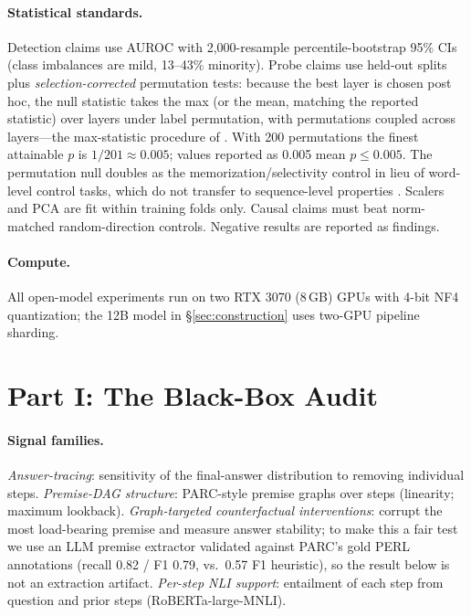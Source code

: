 \documentclass[11pt]{article}
\begin{document}
\paragraph{Statistical standards.} Detection claims use AUROC with 2{,}000-resample percentile-bootstrap 95\% CIs (class imbalances are mild, 13--43\% minority). Probe claims use held-out splits plus \emph{selection-corrected} permutation tests: because the best layer is chosen post hoc, the null statistic takes the max (or the mean, matching the reported statistic) over layers under label permutation, with permutations coupled across layers---the max-statistic procedure of \citet{nichols2002nonparametric}. With 200 permutations the finest attainable $p$ is $1/201 \approx 0.005$; values reported as 0.005 mean $p \leq 0.005$. The permutation null doubles as the memorization/selectivity control in lieu of word-level control tasks, which do not transfer to sequence-level properties \citep{belinkov2022probing}. Scalers and PCA are fit within training folds only. Causal claims must beat norm-matched random-direction controls. Negative results are reported as findings.

\paragraph{Compute.} All open-model experiments run on two RTX 3070 (8\,GB) GPUs with 4-bit NF4 quantization; the 12B model in \S\ref{sec:construction} uses two-GPU pipeline sharding.

\section{Part I: The Black-Box Audit}
\label{sec:audit}

\paragraph{Signal families.} \emph{Answer-tracing}: sensitivity of the final-answer distribution to removing individual steps. \emph{Premise-DAG structure}: PARC-style premise graphs over steps (linearity; maximum lookback). \emph{Graph-targeted counterfactual interventions}: corrupt the most load-bearing premise and measure answer stability; to make this a fair test we use an LLM premise extractor validated against PARC's gold PERL annotations (recall 0.82 / F1 0.79, vs.\ 0.57 F1 heuristic), so the result below is not an extraction artifact. \emph{Per-step NLI support}: entailment of each step from question and prior steps (RoBERTa-large-MNLI).
\end{document}
